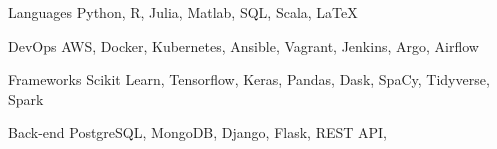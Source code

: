 

\begin{cvskills}

  \cvskill
    {Languages} %
    {Python, R, Julia, Matlab, SQL, Scala, LaTeX} %

  \cvskill
    {DevOps} %
    {AWS, Docker, Kubernetes, Ansible, Vagrant, Jenkins, Argo, Airflow} %

  \cvskill
    {Frameworks} %
    {Scikit Learn, Tensorflow, Keras, Pandas, Dask, SpaCy, Tidyverse, Spark} %

  \cvskill
    {Back-end} %
    {PostgreSQL, MongoDB, Django, Flask, REST API, } %

\end{cvskills}
